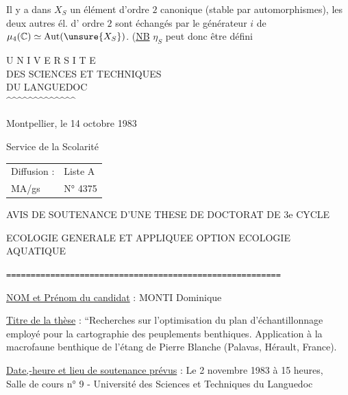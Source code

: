 Il y a dans $X_S$ un élément d'ordre $2$ canonique
(stable par automorphismes), les deux autres él. d'
ordre $2$ sont échangés par le générateur $i$ de
$\mu_4(\mathbb C)\simeq\operatorname{Aut}(\unsure{X_S})$.
(\uline{NB} $\eta_S$ peut donc être défini



\noindent
\begin{minipage}[t]{.46\textwidth}
\begin{center}
U N I V E R S I T E\\
DES SCIENCES ET TECHNIQUES\\
DU LANGUEDOC\\
\textasciicircum\textasciicircum\textasciicircum\textasciicircum\textasciicircum\textasciicircum\textasciicircum\textasciicircum\textasciicircum\textasciicircum\textasciicircum\textasciicircum\textasciicircum
\end{center}
\end{minipage}\hfill
\begin{minipage}[t]{.50\textwidth}
\vspace{.9\baselineskip}
Montpellier, le 14 octobre 1983
\end{minipage}

Service de la Scolarité

\begin{tabular}{@{}ll@{}}
Diffusion : & Liste A\\
MA/gs & N° 4375
\end{tabular}

\begin{center}
AVIS DE SOUTENANCE D'UNE THESE DE DOCTORAT DE 3e CYCLE

ECOLOGIE GENERALE ET APPLIQUEE OPTION ECOLOGIE AQUATIQUE

\texttt{========================================================}
\end{center}

\uline{NOM et Prénom du candidat} : MONTI Dominique

\uline{Titre de la thèse} : ``Recherches sur l'optimisation du plan d'échantillonnage employé pour la cartographie des peuplements benthiques. Application à la macrofaune benthique de l'étang de Pierre Blanche (Palavas, Hérault, France).

\uline{Date,-heure et lieu de soutenance prévus} : Le 2 novembre 1983 à 15 heures,\\
Salle de cours n° 9 - Université des Sciences et Techniques du Languedoc

